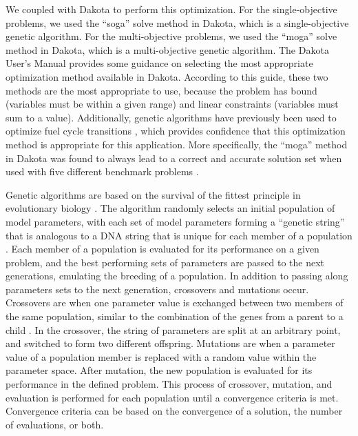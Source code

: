 We coupled \Cyclus \cite{huff_fundamental_2016} with Dakota 
\cite{adams_dakota_2021} to perform this optimization. For the 
single-objective problems, we used the ``soga'' solve method in 
Dakota, which is a single-objective genetic algorithm. For the 
multi-objective problems, we used the ``moga'' solve method in 
Dakota, which is a multi-objective genetic algorithm. The Dakota 
User's Manual \cite{adams_dakota_2021} provides some guidance 
on selecting the most appropriate optimization method available 
in Dakota. According to this guide, these two methods are the most 
appropriate to use, because the problem has bound (variables 
must be within a given range) and linear constraints (variables must 
sum to a value). Additionally, genetic algorithms
have previously been used to optimize fuel cycle transitions 
\cite{passerini_systematic_2014}, which provides confidence that 
this optimization method is appropriate for this application. 
More specifically, the ``moga'' method 
in Dakota was found to always lead to a correct and accurate solution set 
when used with five different benchmark problems \cite{chiandussi_comparison_2012}.


Genetic algorithms are based on the survival of the fittest principle in 
evolutionary biology \cite{adams_dakota_2021}. The algorithm randomly 
selects an initial population of model parameters, with each set of model 
parameters forming a ``genetic string'' that is analogous to a DNA string 
that is unique for each member of a population \cite{adams_dakota_2021}.
Each member of a population is evaluated for its performance on a given 
problem, and the best performing sets of parameters are passed to the next 
generations, emulating the breeding of a population. In addition to 
passing along parameters sets to the next generation, crossovers and 
mutations occur. Crossovers are when one parameter value is exchanged 
between two members of the same population, similar to the combination of 
the genes from a parent to a child \cite{kramer_genetic_2017}. In 
the crossover, the string of parameters are split at an arbitrary point, and 
switched to form two different offspring.
Mutations are when a parameter 
value of a population member is replaced with a random value within the 
parameter space. After mutation, the new population is evaluated for 
its performance in the defined problem. This process of 
crossover, mutation, and evaluation is performed for each population 
until a convergence criteria is met. Convergence criteria can be based on 
the convergence of a solution, the number of evaluations, or both. 

